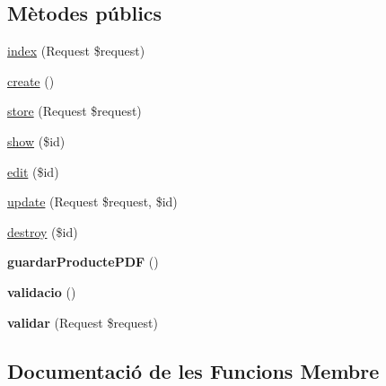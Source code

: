 \subsection*{Mètodes públics}
\begin{DoxyCompactItemize}
\item 
\mbox{\hyperlink{class_app_1_1_http_1_1_controllers_1_1gestio_productes_ab567a949f50e20ea3d95ad062a17e3c3}{index}} (Request \$request)
\item 
\mbox{\hyperlink{class_app_1_1_http_1_1_controllers_1_1gestio_productes_a435e7d7525d4bcd0ed5e34a469f3adf6}{create}} ()
\item 
\mbox{\hyperlink{class_app_1_1_http_1_1_controllers_1_1gestio_productes_a9ef485163104597c12185b53cdacf638}{store}} (Request \$request)
\item 
\mbox{\hyperlink{class_app_1_1_http_1_1_controllers_1_1gestio_productes_ae4914d07a9bbe4aede7a5dea759f6287}{show}} (\$id)
\item 
\mbox{\hyperlink{class_app_1_1_http_1_1_controllers_1_1gestio_productes_a459ed16587e3a50b39b672c7e473abc5}{edit}} (\$id)
\item 
\mbox{\hyperlink{class_app_1_1_http_1_1_controllers_1_1gestio_productes_affb03cc19897a1800a0f411264d6c7cc}{update}} (Request \$request, \$id)
\item 
\mbox{\hyperlink{class_app_1_1_http_1_1_controllers_1_1gestio_productes_a726fa8a4b4b187b9ca32ba427aac8137}{destroy}} (\$id)
\item 
\mbox{\label{class_app_1_1_http_1_1_controllers_1_1gestio_productes_af022667704cf88eca8a1cf90d62d8e3a}} 
{\bfseries guardar\+Producte\+P\+DF} ()
\item 
\mbox{\label{class_app_1_1_http_1_1_controllers_1_1gestio_productes_adae0c523b367d8b3549719bce88a60ad}} 
{\bfseries validacio} ()
\item 
\mbox{\label{class_app_1_1_http_1_1_controllers_1_1gestio_productes_a1d8b44926600fa32475da14bb8644d0e}} 
{\bfseries validar} (Request \$request)
\end{DoxyCompactItemize}


\subsection{Documentació de les Funcions Membre}
\mbox{\label{class_app_1_1_http_1_1_controllers_1_1gestio_productes_a435e7d7525d4bcd0ed5e34a469f3adf6}} 
